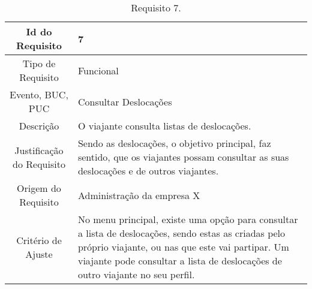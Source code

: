 \begin{table}[H]
\begin{center}
  \begin{tabularx}{\textwidth}{ | c | X | }
    \hline
    Id do Requisito & 7  \\
    
    \hline
    Tipo de Requisito & Funcional \\
    
    \hline
    Evento, BUC, PUC &  Consultar Deslocações\\
    
    \hline
    Descrição & O viajante consulta listas de deslocações. \\
    
    \hline
    Justificação do Requisito & Sendo as deslocações, o objetivo principal, faz sentido, que os viajantes possam consultar as suas deslocações e de outros viajantes.  \\
    
    \hline
    Origem do Requisito & Administração da empresa X \\
    
    \hline
    Critério de Ajuste & No menu principal, existe uma opção para consultar a lista de deslocações, sendo estas as criadas pelo próprio viajante, ou nas que este vai partipar. Um viajante pode consultar a lista de deslocações de outro viajante no seu perfil.\\
    
    \hline
  \end{tabularx}
  \caption{Requisito 7.} \label{tab:r3}
\end{center}
\end{table}

